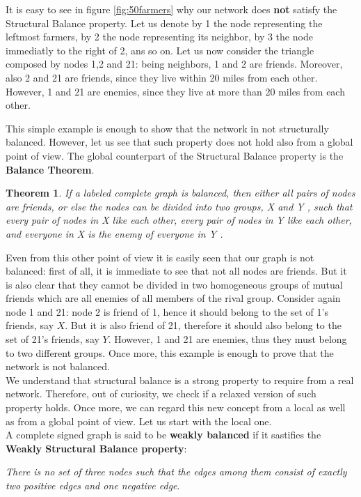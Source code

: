 \documentclass{report}
\newtheorem*{thm}{Theorem}
\theoremstyle{definition}
\theoremstyle{remark}
\begin{document}
It is easy to see in figure \ref{fig:50farmers} why our network does \textbf{not} satisfy the Structural Balance property. Let us denote by 1 the node representing the leftmost farmers, by 2 the node representing its neighbor, by 3 the node immediatly to the right of 2, ans so on. Let us now consider the triangle composed by nodes 1,2 and 21: being neighbors, 1 and 2 are friends. Moreover, also 2 and 21 are friends, since they live within 20 miles from each other. However, 1 and 21 are enemies, since they live at more than 20 miles from each other.

This simple example is enough to show that the network in not structurally balanced. However, let us see that such property does not hold also from a global point of view. The global counterpart of the Structural Balance property is the \textbf{Balance Theorem}.
\begin{thm}
	If a labeled complete graph is balanced, then either all pairs
	of nodes are friends, or else the nodes can be divided into two groups, X and Y ,
	such that every pair of nodes in X like each other, every pair of nodes in Y like
	each other, and everyone in X is the enemy of everyone in Y .
\end{thm}
Even from this other point of view it is easily seen that our graph is not balanced: first of all, it is immediate to see that not all nodes are friends. But it is also clear that they cannot be divided in two homogeneous groups of mutual friends which are all enemies of all members of the rival group. Consider again node 1 and 21: node 2 is friend of 1, hence it should belong to the set of 1's friends, say $X$. But it is also friend of 21, therefore it should also belong to the set of 21's friends, say $Y$. However, 1 and 21 are enemies, thus they must belong to two different groups. Once more, this example is enough to prove that the network is not balanced.\\
We understand that structural balance is a strong property to require from a real network. Therefore, out of curiosity, we check if a relaxed version of such property holds. Once more, we can regard this new concept from a local as well as from a global point of view. Let us start with the local one.\\
A complete signed graph is said to be \textbf{weakly balanced} if it sastifies the \textbf{Weakly Structural Balance property}:
\bigskip

\textit{There is no set of three nodes such that the edges among them consist of exactly two positive edges and one negative edge}.
\bigskip
\end{document}
